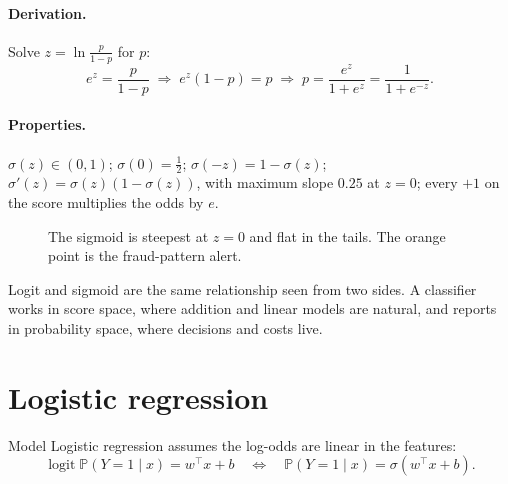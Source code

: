 \documentclass[11pt,a4paper]{article}
\newcommand{\Prob}{\mathbb{P}}
\DeclareMathOperator{\logit}{logit}
\theoremstyle{definition}
\begin{document}
\paragraph{Derivation.} Solve $z=\ln\frac{p}{1-p}$ for $p$:
\[
e^{z}=\frac{p}{1-p}\;\Rightarrow\; e^{z}(1-p)=p\;\Rightarrow\; p=\frac{e^{z}}{1+e^{z}}=\frac{1}{1+e^{-z}}.
\]

\paragraph{Properties.} $\sigma(z)\in(0,1)$; $\sigma(0)=\tfrac12$; $\sigma(-z)=1-\sigma(z)$; $\sigma'(z)=\sigma(z)(1-\sigma(z))$, with maximum slope $0.25$ at $z=0$; every $+1$ on the score multiplies the odds by $e$.

\begin{figure}[h]
\centering
{}
\caption{The sigmoid is steepest at $z=0$ and flat in the tails. The orange point is the fraud-pattern alert.}
\end{figure}

\begin{insight}
Logit and sigmoid are the same relationship seen from two sides. A classifier works in score space, where addition and linear models are natural, and reports in probability space, where decisions and costs live.
\end{insight}

\section{Logistic regression}

\begin{metric}{Model}
Logistic regression assumes the log-odds are linear in the features:
\[
\logit\Prob(Y=1\mid x)=w^\top x+b
\quad\Longleftrightarrow\quad
\Prob(Y=1\mid x)=\sigma(w^\top x+b).
\]
\end{metric}
\end{document}
